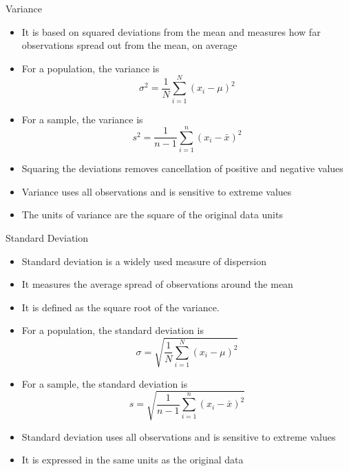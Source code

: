 \documentclass[12pt, aspectratio=169]{beamer}
\begin{document}
    \begin{frame}{Variance}
        \begin{itemize}
            \item It is based on squared deviations from the mean and measures how far observations spread out from the mean, on average
            \item For a population, the variance is
            \[
                \sigma^2 = \frac{1}{N} \sum_{i=1}^{N} (x_i - \mu)^2
            \]
            \item For a sample, the variance is
            \[
                s^2 = \frac{1}{n-1} \sum_{i=1}^{n} (x_i - \bar{x})^2
            \]
            \item Squaring the deviations removes cancellation of positive and negative values
            \item Variance uses all observations and is sensitive to extreme values
            \item The units of variance are the square of the original data units
        \end{itemize}
    \end{frame}


    \begin{frame}{Standard Deviation}
        \begin{itemize}
            \item Standard deviation is a widely used measure of dispersion
            \item It measures the average spread of observations around the mean
            \item It is defined as the square root of the variance.
            \item For a population, the standard deviation is
            \[
                \sigma = \sqrt{\frac{1}{N} \sum_{i=1}^{N} (x_i - \mu)^2}
            \]
            \item For a sample, the standard deviation is
            \[
                s = \sqrt{\frac{1}{n-1} \sum_{i=1}^{n} (x_i - \bar{x})^2}
            \]
            \item Standard deviation uses all observations and is sensitive to extreme values
            \item It is expressed in the same units as the original data
        \end{itemize}
    \end{frame}
\end{document}
